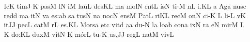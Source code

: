 \nosolesmescustos
{}\Internote
{}
\initiumgregorianum
{}%
\sgn {}Ic\punctum K\egn
\sgn tim\punctum J\egn
\sgn {}{\ae}{}\punctum K\egn
\spatium
\sgn pas\punctum M\egn
{}l\punctum N\egn
\sgn {}i{}\punctum M\egn
\spatium
\sgn l{a}u\punctum L\egn
\sgn des\punctum K\augmentum L\egn
\spatium
\Asteriscus
\divisiominima
\spatium
\sgn {}{\'\i}m\punctum a\egn
\sgn mol\punctum N\egn
\sgn {}e{nt}\punctum L\egn
\spatium
{}is\punctum N\egn
\sgn ti-\punctum M\egn
{}n\punctum L\egn
\sgn {}i.\punctum K\augmentum L\egn
\spatium
\divisiofinalis
\spatium
\custos a
\lineaproxima
\sgn {}Ag\punctum a\egn
\sgn nus\punctum c\egn
\spatium
\sgn red\punctum d\egn
{}m\punctum a\egn
\sgn {}it\punctum N\egn
\spatium
{}v\punctum a\egn
\sgn {}e{s:}\punctum a\augmentum b\egn
\spatium
\divisiominor
\spatium
{}s\punctum a\egn
\sgn tus\punctum N\egn
\spatium
\sgn {}{\'\i}n\punctum a\egn
\sgn noc\punctum N\egn
\sgn {}e{ns}\punctum M\egn
\spatium
\sgn P{a}t\punctum L\egn
\sgn ri{}\punctum K\augmentum L\egn
\spatium
\divisiominima
\spatium
\sgn rec\punctum M\egn
\sgn {}on\punctum N\egn
\sgn ci-\punctum K\egn
\custos L
\lineaproxima
\sgn li-\punctum L\egn
{}v\punctum K\egn
\sgn {}it\punctum J\augmentum J\egn
\spatium
\sgn pec\punctum L\egn
\sgn cat\punctum M\egn
{}r\punctum L\egn
\sgn {}e{s.}\punctum K\augmentum L\egn
\spatium
\divisiofinalis
\spatium
\sgn Mo{rs}\punctum a\egn
\spatium
\sgn {}et\punctum c\egn
\spatium
\sgn v{i}t\punctum d\egn
\sgn {}a{}\punctum a\egn
\spatium
\sgn du-\punctum N\egn
{}l\punctum a\egn
\sgn lo{}\punctum a\augmentum b\egn
\spatium
\divisiominima
\spatium
\sgn con\punctum a\egn
{}ix\punctum N\egn
{}r\punctum a\egn
\sgn {}e{}\punctum N\egn
\spatium
\sgn mir\punctum M\egn
{}\punctum L\egn
{}\Internote
\custos K
\lineaproxima
\sgn do:\punctum K\augmentum L\egn
\spatium
\divisiominor
\spatium
\sgn dux\punctum M\egn
\spatium
\sgn v{i}t\punctum N\egn
\sgn {}{\ae}{}\punctum K\egn
\spatium
\sgn m{\'o}r\punctum L\egn
\sgn tu-\punctum K\egn
\sgn {}u{s,}\punctum J\augmentum J\egn
\spatium
\sgn r{e}g\punctum L\egn
\sgn nat\punctum M\egn
\spatium
\sgn v{i}v\punctum L\egn
